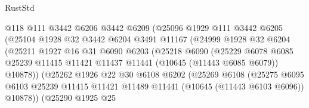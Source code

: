 \begin{lexlean}{RustStd}
\begin{coremodule}
                            @118
                            @111
                            @3442
                            @6206
                            @3442
                            @6209
                            (@25096
                              @1929
                              @111
                              @3442
                              @6205
                              (@25104
                                @1928
                                @32
                                @3442
                                @6204
                                @3491
                                @11167
                                (@24999
                                  @1928
                                  @32
                                  @6204
                                  (@25211
                                    @1927
                                    @16
                                    @31
                                    @6090
                                    @6203
                                    (@25218
                                      @6090
                                      (@25229
                                        @6078
                                        @6085
                                        @25239
                                        @11415
                                        @11421
                                        @11437
                                        @11441
                                        (@10645 (@11443 @6085 @6079))
                                        @10878))
                                    (@25262
                                      @1926
                                      @22
                                      @30
                                      @6108
                                      @6202
                                      (@25269
                                        @6108
                                        (@25275
                                          @6095
                                          @6103
                                          @25239
                                          @11415
                                          @11421
                                          @11489
                                          @11441
                                          (@10645 (@11443 @6103 @6096))
                                          @10878))
                                      (@25290
                                        @1925
                                        @25

\end{coremodule}
\end{lexlean}
